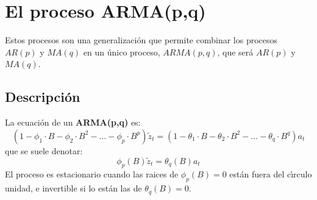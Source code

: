 %
%

\section{El proceso ARMA(p,q)}

Estos procesos son una generalizaci\'on que permite combinar los procesos
$AR(p)$ y $MA(q)$ en un \'unico proceso, $ARMA(p,q)$, que ser\'a $AR(p)$ y
$MA(q)$.

\subsection{Descripci\'on}

La ecuaci\'on de un \textbf{ARMA(p,q)} es:
\begin{displaymath}
(1-\phi_1\cdot B-\phi_2\cdot B^2-\dots -\phi_p\cdot B^p)\widetilde{z}_t=
(1-\theta_1\cdot B-\theta_2\cdot B^2-\dots -\theta_q\cdot B^q)a_t
\end{displaymath}
que se suele denotar:
\begin{equation}
\phi_p(B)\widetilde{z}_t = \theta_q(B)a_t
\end{equation}
El proceso es estacionario cuando las raices de $\phi_p(B)=0$  est\'an fuera del
c\'{\i}rculo unidad, e invertible si lo est\'an las de $\theta_q(B)=0$.
